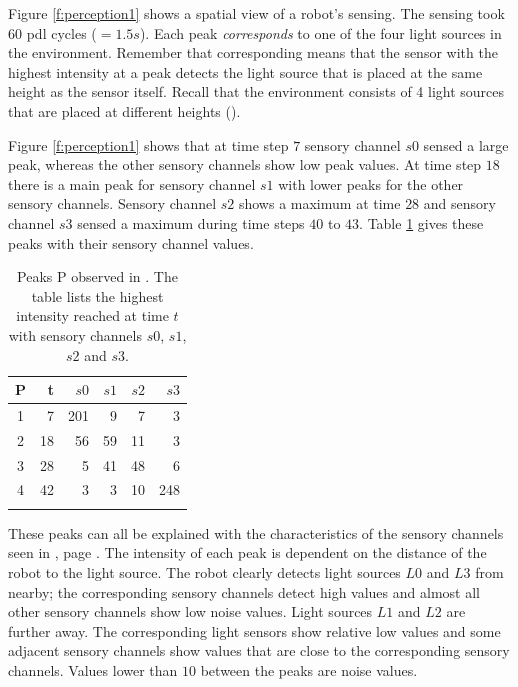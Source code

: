 
Figure \ref{f:perception1} shows a spatial view of a robot's sensing. The sensing took $60$ {\sc pdl} cycles ($=1.5 s$). Each peak {\em corresponds} to one of the four light sources in the environment. Remember that corresponding means that the sensor with the highest intensity at a peak detects the light source that is placed at the same height as the sensor itself. Recall that the environment consists of 4 light sources that are placed at different heights (). 

Figure \ref{f:perception1} shows that at time step $7$ sensory channel $s0$ sensed a large peak, whereas the other sensory channels show low peak values. At time step $18$ there is a main peak  for sensory channel $s1$ with lower peaks for the other sensory channels. Sensory channel $s2$ shows a maximum at time $28$ and sensory channel $s3$ sensed a maximum during time steps $40$ to $43$. Table \ref{t:perception1} gives these peaks with their sensory channel values.

\begin{table}
\centering
\begin{tabular}{crrrrr}
\lsptoprule
P & t & $s0$ & $s1$ & $s2$ & $s3$\\
\midrule
1 & 7 & 201 & 9 & 7 & 3\\
2 & 18 & 56 & 59 & 11 & 3\\
3 & 28 & 5 & 41 & 48 & 6\\
4 & 42 & 3 & 3 & 10 & 248\\
\lspbottomrule
\end{tabular}
\caption{Peaks P observed in . The table lists the highest intensity reached at time $t$ with sensory channels $s0$, $s1$, $s2$ and $s3$.}
\label{t:perception1}
\end{table}

These peaks can all be explained with the characteristics of the sensory channels seen in , page \pageref{f:robots:calibration}.  The intensity of each peak is dependent on the distance of the robot to the light source. The robot clearly detects light sources $L0$ and $L3$ from nearby; the corresponding sensory channels detect high values and almost all other sensory channels show low noise values. Light sources $L1$ and $L2$ are further away. The corresponding light sensors show relative low values and some adjacent sensory channels show values that are close to the corresponding sensory channels. Values lower than $10$ between the peaks are noise values.

